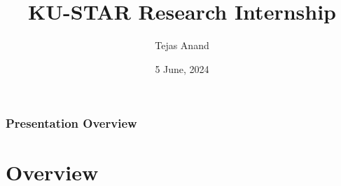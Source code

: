 \documentclass[
	11pt, %
]{beamer}
\title[KU-STAR Research Internship]{KU-STAR Research Internship} %
\subtitle{} %
\author[Tejas]{Tejas Anand} %
\institute[IITD]{IIT Delhi \\ Kyoto University \smallskip \textit{}} %
\date[5 June, 2024]{5 June, 2024}
\begin{document}

\begin{frame}
	\titlepage %
\end{frame}



\begin{frame}
	\frametitle{Presentation Overview} %
	
	\tableofcontents %
\end{frame}


\section{Overview} %
\end{document}
